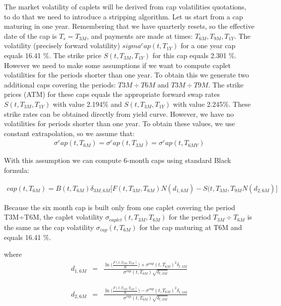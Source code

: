 \documentclass[11pt]{article}
\numberwithin{equation}{subsection}
\begin{document}
The market volatility of caplets will be derived from cap volatilities quotations, to do that
we need to introduce a stripping algorithm.
Let us start from a cap maturing in one year. Remembering that we have quarterly resets,
so the effective date of the cap is \(T_s =T_{3M}\), and payments are made at times: \(T_{6M}, T_{9M}, T_{1Y}\).
The volatility (precisely forward volatility) \(sigma^cap(t, T_{1Y})\) for a one year cap equals 16.41 \%.
The strike price \(S(t, T_{3M}, T_{1Y})\) for this cap equals 2.301 \%. However we need to make
some assumptions if we want to compute caplet volatilities for the periods shorter than
one year. To obtain this we generate two additional caps covering the periods: \(T3M÷T6M\)
and \(T3M÷T9M\). The strike prices (ATM) for these caps equals the appropriate forward
swap rates \(S(t, T_{3M}, T_{1Y})\) with value 2.194\% and \(S(t, T_{3M}, T_{1Y})\) with value 2.245\%. These
strike rates can be obtained directly from yield curve. However, we have no volatilities for
periods shorter than one year. To obtain these values, we use constant extrapolation, so
we assume that: 
\begin{eqnarray*}
\sigma^cap(t, T_{6M}) = \sigma^cap(t, T_{3M}) = \sigma^cap(t, T_{6MY}) 
\end{eqnarray*}

With this assumption we can
compute 6-month caps using standard Black formula:

\begin{eqnarray*}
	cap(t, T_{6M}) = B(t, T_{6M}) \delta_{3M,6M} \big[ F(t, T_{3M}, T_{6M}) N(d_{1,6M}) - S(t, T_{3M}, T_{9M}N(d_{2,6M}) \big]
\end{eqnarray*}


Because the six month cap is built only from one caplet covering the period T3M÷T6M, the caplet volatility \(\sigma_{caplet}(t, T_{3M}, T_{6M})\) for the period \(T_{3
	M} ÷T_{6M}\) is the same as the cap volatility \(\sigma_{cap}(t, T_{6M})\) for the cap maturing at T6M and equals 16.41 \%.


where 
\begin{eqnarray*}
	d_{1,6M}&=&\frac{\ln\Big(\frac{F(t, T_{3M}, T_{6M})}{K}\Big) + \sigma^{cap}(t, T_{6M})^2\delta_{t, 3M}}{\sigma^{cap}(t, T_{6M})\sqrt{\delta_{t,3M}}}
\end{eqnarray*}

\begin{eqnarray*}
	d_{2,6M}&=&\frac{\ln\Big(\frac{F(t, T_{3M}, T_{6M})}{K}\Big) - \sigma^{cap}(t, T_{6M})^2\delta_{t, 3M}}{\sigma^{cap}(t, T_{6M})\sqrt{\delta_{t,3M}}}
\end{eqnarray*}
\end{document}
